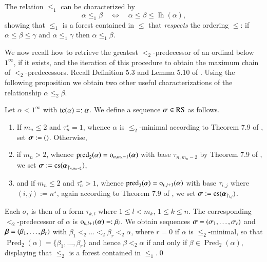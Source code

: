 \documentclass[3p,10pt,times]{elsarticle}
\newcommand{\al}{\alpha}
\newcommand{\alvec}{{\vec{\al}}}
\newcommand{\be}{\beta}
\newcommand{\bevec}{{\vec{\be}}}
\newcommand{\ga}{\gamma}
\newcommand{\sivec}{{\vec{\si}}}
\newcommand{\taunstar}{{\tau_n^\star}}
\newcommand{\si}{\sigma}
\newcommand{\leo}{\le_1}
\newcommand{\lh}{{\operatorname{lh}}}
\newcommand{\aeq}{\Leftrightarrow}
\newcommand{\oneinf}{1^\infty}
\newcommand{\cs}{{\mathrm{cs}}}
\newcommand{\tc}{{\mathrm{tc}}}
\newcommand{\RS}{\mathrm{RS}}
\newcommand{\letwo}{\le_2}
\newcommand{\ktwo}{<_2}
\newcommand{\taucp}[1]{{\tau_{#1}}}
\newcommand{\ordcp}[1]{{\mathrm{o}_{#1}}}
\newcommand{\predec}{\operatorname{pred}}
\newcommand{\predecs}{\operatorname{Pred}}
\def\vec#1{\mathchoice{\mbox{\boldmath$\displaystyle#1$}}
{\mbox{\boldmath$\textstyle#1$}}
{\mbox{\boldmath$\scriptstyle#1$}}
{\mbox{\boldmath$\scriptscriptstyle#1$}}}
\begin{document}
The relation $\leo$ can be characterized by 
\begin{equation}\label{leoequation}\al\leo\be 
\quad\aeq\quad\al\le\be\le\lh(\al),
\end{equation} 
showing that $\leo$ is a forest contained in $\le$ that \emph{respects} the ordering $\le$: 
if $\al\le\be\le\ga$ and $\al\leo\ga$ then $\al\leo\be$. 
  
We now recall how to retrieve the greatest $\ktwo$-predecessor of an ordinal below $\oneinf$, if it exists, and the iteration of this procedure to obtain the maximum
chain of $\ktwo$-predecessors. Recall Definition 5.3 and Lemma 5.10 of \cite{CWc}.
Using the following proposition we obtain two other useful characterizations of the relationship $\al\letwo\be$. 
 
\begin{prop}[5.6 of \cite{W}]\label{letwopredprop} Let $\al<\oneinf$ with $\tc(\al)=:\alvec$.
We define a sequence $\sivec\in\RS$ as follows.
\begin{enumerate}
\item If $m_n\le2$ and $\taunstar=1$, whence $\al$ is $\letwo$-minimal according to Theorem 7.9 of \cite{CWc}, set $\sivec:=()$. Otherwise,
\item if $m_n>2$, whence $\predec_2(\al)=\ordcp{n,m_n-1}(\alvec)$ with base $\taucp{n,m_n-2}$ by Theorem 7.9 of \cite{CWc}, we set
$\sivec:=\cs(\alvec_{\restriction_{n,m_n-2}})$,
\item and if $m_n\le2$ and $\taunstar>1$, whence $\predec_2(\al)=\ordcp{i,j+1}(\alvec)$ with base $\taucp{i,j}$ where $(i,j):=n^\star$, again according to Theorem 7.9 of \cite{CWc}, we set
$\sivec:=\cs(\alvec_{\restriction_{i,j}})$.
\end{enumerate}
Each $\si_i$ is then of a form $\taucp{k,l}$ where $1\le l< m_k$, $1\le k \le n$. The corresponding $\ktwo$-predecessor of $\al$ is $\ordcp{k,l+1}(\alvec)=:\be_i$.
We obtain sequences $\sivec=(\si_1,\ldots,\si_r)$ and $\bevec=(\be_1,\ldots,\be_r)$ with $\be_1\ktwo\ldots\ktwo\be_r\ktwo\al$, where $r=0$ if $\al$ is $\letwo$-minimal,
so that $\predecs_2(\al)=\{\be_1,\ldots,\be_r\}$ and hence
$\be\ktwo\al$ if and only if $\be\in\predecs_2(\al)$, displaying that $\letwo$ is a forest contained in $\leo$.\qed 
\end{prop}
\end{document}
